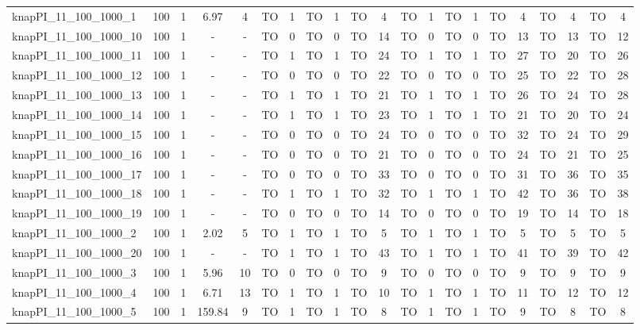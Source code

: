 \begin{sidewaystable}[!ht]
{\begin{tabular}{lcccccccccccccccccccc}
knapPI\_11\_100\_1000\_1 & 100 & 1 & 6.97 & 4 & TO & 1 & TO & 1 & TO & 4 & TO & 1 & TO & 1 & TO & 4 & TO & 4 & TO & 4 \\
knapPI\_11\_100\_1000\_10 & 100 & 1 &  - &  - & TO & 0 & TO & 0 & TO & 14 & TO & 0 & TO & 0 & TO & 13 & TO & 13 & TO & 12 \\
knapPI\_11\_100\_1000\_11 & 100 & 1 &  - &  - & TO & 1 & TO & 1 & TO & 24 & TO & 1 & TO & 1 & TO & 27 & TO & 20 & TO & 26 \\
knapPI\_11\_100\_1000\_12 & 100 & 1 &  - &  - & TO & 0 & TO & 0 & TO & 22 & TO & 0 & TO & 0 & TO & 25 & TO & 22 & TO & 28 \\
knapPI\_11\_100\_1000\_13 & 100 & 1 &  - &  - & TO & 1 & TO & 1 & TO & 21 & TO & 1 & TO & 1 & TO & 26 & TO & 24 & TO & 28 \\
knapPI\_11\_100\_1000\_14 & 100 & 1 &  - &  - & TO & 1 & TO & 1 & TO & 23 & TO & 1 & TO & 1 & TO & 21 & TO & 20 & TO & 24 \\
knapPI\_11\_100\_1000\_15 & 100 & 1 &  - &  - & TO & 0 & TO & 0 & TO & 24 & TO & 0 & TO & 0 & TO & 32 & TO & 24 & TO & 29 \\
knapPI\_11\_100\_1000\_16 & 100 & 1 &  - &  - & TO & 0 & TO & 0 & TO & 21 & TO & 0 & TO & 0 & TO & 24 & TO & 21 & TO & 25 \\
knapPI\_11\_100\_1000\_17 & 100 & 1 &  - &  - & TO & 0 & TO & 0 & TO & 33 & TO & 0 & TO & 0 & TO & 31 & TO & 36 & TO & 35 \\
knapPI\_11\_100\_1000\_18 & 100 & 1 &  - &  - & TO & 1 & TO & 1 & TO & 32 & TO & 1 & TO & 1 & TO & 42 & TO & 36 & TO & 38 \\
knapPI\_11\_100\_1000\_19 & 100 & 1 &  - &  - & TO & 0 & TO & 0 & TO & 14 & TO & 0 & TO & 0 & TO & 19 & TO & 14 & TO & 18 \\
knapPI\_11\_100\_1000\_2 & 100 & 1 & 2.02 & 5 & TO & 1 & TO & 1 & TO & 5 & TO & 1 & TO & 1 & TO & 5 & TO & 5 & TO & 5 \\
knapPI\_11\_100\_1000\_20 & 100 & 1 &  - &  - & TO & 1 & TO & 1 & TO & 43 & TO & 1 & TO & 1 & TO & 41 & TO & 39 & TO & 42 \\
knapPI\_11\_100\_1000\_3 & 100 & 1 & 5.96 & 10 & TO & 0 & TO & 0 & TO & 9 & TO & 0 & TO & 0 & TO & 9 & TO & 9 & TO & 9 \\
knapPI\_11\_100\_1000\_4 & 100 & 1 & 6.71 & 13 & TO & 1 & TO & 1 & TO & 10 & TO & 1 & TO & 1 & TO & 11 & TO & 12 & TO & 12 \\
knapPI\_11\_100\_1000\_5 & 100 & 1 & 159.84 & 9 & TO & 1 & TO & 1 & TO & 8 & TO & 1 & TO & 1 & TO & 9 & TO & 8 & TO & 8 \\

\end{tabular}}
\end{sidewaystable}
